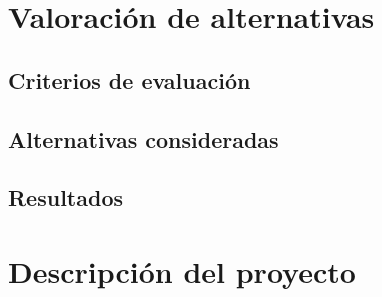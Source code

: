 \section{Valoración de alternativas}\label{sec:alternativas}
\subsection{Criterios de evaluación}\label{subsec:criterios}

\subsection{Alternativas consideradas}\label{subsec:alternativas}

\subsection{Resultados}\label{subsec:resultados}

\newpage{}
\section{Descripción del proyecto}\label{sec:descripcion}
